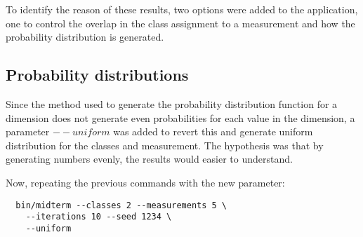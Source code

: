 \documentclass[letterpaper, conference]{IEEEtran}
\begin{document}
To identify the reason of these results, two options were added to the application, one to control the overlap in the class assignment to a measurement and how the probability distribution is generated.

\subsection{Probability distributions}

Since the method used to generate the probability distribution function for a dimension does not generate even probabilities for each value in the dimension, a parameter $--uniform$ was added to revert this and generate uniform distribution for the classes and measurement. The hypothesis was that by generating numbers evenly, the results would easier to understand.

Now, repeating the previous commands with the new parameter:

\begin{verbatim}
  bin/midterm --classes 2 --measurements 5 \
    --iterations 10 --seed 1234 \
    --uniform
\end{verbatim}

\vspace{1cm}
\vspace{1cm}
\end{document}
